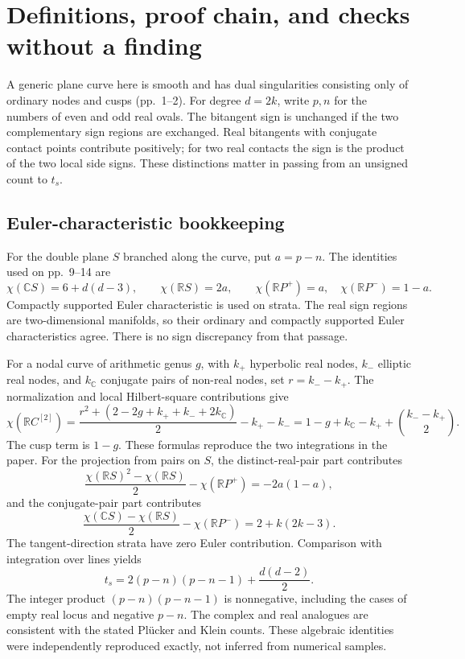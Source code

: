 \documentclass[10pt]{article}
\begin{document}
\section*{Definitions, proof chain, and checks without a finding}
A generic plane curve here is smooth and has dual singularities consisting only of ordinary nodes and cusps (pp. 1–2). For degree \(d=2k\), write \(p,n\) for the numbers of even and odd real ovals. The bitangent sign is unchanged if the two complementary sign regions are exchanged. Real bitangents with conjugate contact points contribute positively; for two real contacts the sign is the product of the two local side signs. These distinctions matter in passing from an unsigned count to \(t_s\).\par
\subsection*{Euler-characteristic bookkeeping}
For the double plane \(S\) branched along the curve, put \(a=p-n\). The identities used on pp. 9–14 are \[\chi(\mathbb CS)=6+d(d-3),\qquad
 \chi(\mathbb RS)=2a,\qquad
 \chi(\mathbb RP^+)=a,\quad \chi(\mathbb RP^-)=1-a.\] Compactly supported Euler characteristic is used on strata. The real sign regions are two-dimensional manifolds, so their ordinary and compactly supported Euler characteristics agree. There is no sign discrepancy from that passage.\par
For a nodal curve of arithmetic genus \(g\), with \(k_+\) hyperbolic real nodes, \(k_-\) elliptic real nodes, and \(k_{\mathbb C}\) conjugate pairs of non-real nodes, set \(r=k_--k_+\). The normalization and local Hilbert-square contributions give \[\chi(\mathbb RC^{[2]})
 =\frac{r^2+(2-2g+k_++k_-+2k_{\mathbb C})}{2}-k_+-k_-
 =1-g+k_{\mathbb C}-k_++\binom{k_--k_+}{2}.\] The cusp term is \(1-g\). These formulas reproduce the two integrations in the paper. For the projection from pairs on \(S\), the distinct-real-pair part contributes \[\frac{\chi(\mathbb RS)^2-\chi(\mathbb RS)}2-\chi(\mathbb RP^+)
 =-2a(1-a),\] and the conjugate-pair part contributes \[\frac{\chi(\mathbb CS)-\chi(\mathbb RS)}2-\chi(\mathbb RP^-)
 =2+k(2k-3).\] The tangent-direction strata have zero Euler contribution. Comparison with integration over lines yields \[t_s=2(p-n)(p-n-1)+\frac{d(d-2)}2.\] The integer product \((p-n)(p-n-1)\) is nonnegative, including the cases of empty real locus and negative \(p-n\). The complex and real analogues are consistent with the stated Plücker and Klein counts. These algebraic identities were independently reproduced exactly, not inferred from numerical samples.\par
\end{document}
